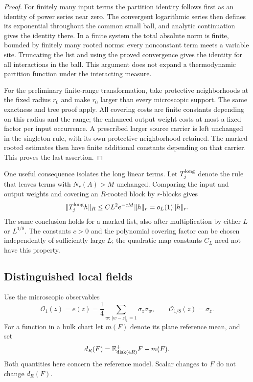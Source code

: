 \begin{proof}
For finitely many input terms the partition identity follows first as an
identity of power series near zero.  The convergent logarithmic series
then defines its exponential throughout the common small ball, and
analytic continuation gives the identity there.  In a finite system the
total absolute norm is finite, bounded by finitely many rooted norms:
every nonconstant term meets a variable site.  Truncating the list and
using the proved convergence gives the identity for all interactions in
the ball.  This argument does not expand a thermodynamic partition
function under the interacting measure.

For the preliminary finite-range transformation, take protective
neighborhoods at the fixed radius $r_0$ and make $r_0$ larger than every
microscopic support.  The same exactness and tree proof apply.  All
covering costs are finite constants depending on this radius and the
range; the enhanced output weight costs at most a fixed factor per input
occurrence.  A prescribed larger source carrier is left unchanged in the
singleton rule, with its own protective neighborhood retained.  The
marked rooted estimates then have finite additional constants depending
on that carrier.  This proves the last assertion.
\end{proof}

One useful consequence isolates the long linear terms.  Let
$T_j^{\rm long}$ denote the rule that leaves terms with $N_r(A)>M$
unchanged.  Comparing the input and output weights and covering an
$R$-rooted block by $r$-blocks gives
\begin{equation}
 \|T_j^{\rm long}h\|_R
 \le C L^2 e^{-cM}\|h\|_r=o_L(1)\|h\|_r.
 \label{rg:long-tail}
\end{equation}
The same conclusion holds for a marked list, also after multiplication
by either $L$ or $L^{1/8}$.  The constants $c>0$ and the polynomial
covering factor can be chosen independently of sufficiently large $L$;
the quadratic map constants $C_L$ need not have this property.

\subsection{Distinguished local fields}

Use the microscopic observables
\[
 \mathcal O_1(z)=e(z)=\frac14\sum_{w:\,|w-z|_1=1}\sigma_z\sigma_w,
 \qquad
 \mathcal O_{1/8}(z)=\sigma_z.
\]
For a function in a bulk chart let $m(F)$ denote its plane reference mean,
and set
\[
 d_R(F)=\mathbb E^+_{\operatorname{disk}(4R)}F-m(F).
\]
Both quantities here concern the reference model.  Scalar changes to
$F$ do not change $d_R(F)$.

